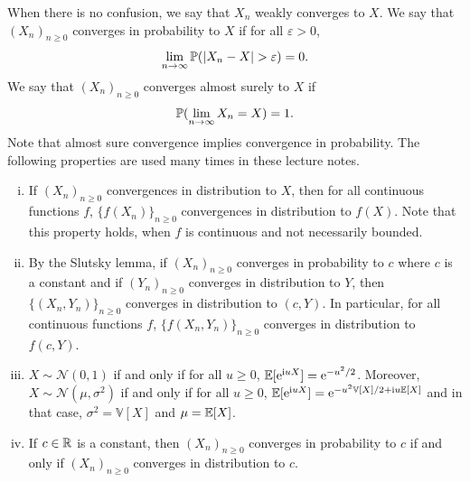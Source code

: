 \documentclass[english,graybox,envcountchap,envcountsame,sectrefs,shortlabels]{svmono}
\theoremstyle{style}
\newcommand{\rme}{\mathrm{e}}
\newcommand{\rmi}{\mathrm{i}}
\newcommand{\gauss}{\mathcal{N}}
\newcommand{\eqsp}{}
\begin{document}
When there is no confusion, we say that $X_n$ weakly converges to $X$. We say that $(X_n)_{n\geq 0}$ converges in probability to $X$ if for all $\varepsilon>0$,
$$
\lim_{n \to \infty} \PP(|X_n -X|>\varepsilon)=0\eqsp.
$$
 We say that $(X_n)_{n\geq 0}$ converges almost surely to $X$ if
$$
\PP(\lim_{n \to \infty}X_n=X)=1\eqsp.
$$
Note that almost sure convergence implies convergence in probability.
\newcommand{\var}{\mathrm{var}}
The following properties are used many times in these lecture notes.
\begin{enumerate}[(i)]
\item If $(X_n)_{n\geq 0}$ convergences in distribution to $X$, then for all continuous functions $f$, $\{f(X_n)\}_{n\geq 0}$ convergences in distribution to $f(X)$. Note that this property  holds, when $f$ is continuous and not necessarily bounded.
\item By the Slutsky lemma, if $(X_n)_{n\geq 0}$ converges in probability to $c$ where $c$ is a constant and if $(Y_n)_{n\geq 0}$ converges in distribution to $Y$, then $\{(X_n,Y_n)\}_{n\geq 0}$ converges in distribution to $(c,Y)$. In particular, for all continuous functions $f$, $\{f(X_n,Y_n)\}_{n\geq 0}$ converges in distribution to $f(c,Y)$.
\item $X \sim \gauss(0,1)$ if and only if for all $u \geq 0$, $\PE[\rme^{\rmi u
    X}]=\rme^{-u^2/2}$. Moreover, $X \sim \gauss(\mu,\sigma^2)$ if and only if
  for all $u \geq 0$, $\PE[\rme^{\rmi u X}]=\rme^{-u^2 \mathbb{V}[X]/2+\rmi
    u \PE[X]}$ and in that case, $\sigma^2=\mathbb{V}[X]$ and $\mu=\mathbb{E}[X]$.
 \item If $c\in\mathbb{R}$ is a constant, then $(X_n)_{n\geq 0}$ converges in probability to $c$ if and only if $(X_n)_{n\geq 0}$ converges in distribution to $c$.
\end{enumerate}



\dominitoc
\tableofcontents
\end{document}
